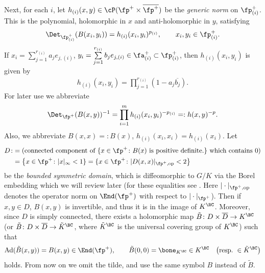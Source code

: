 Next, for each $i$, let $h_{(i)}(x,y)\in\cP(\fp^+\times\overline{\fp^+})$ be the \textit{generic norm} on $\fp^+_{(i)}$.
This is the polynomial, holomorphic in $x$ and anti-holomorphic in $y$, satisfying
\begin{gather*} \Det_{\fp^+_{(i)}}(B(x_i,y_i))=h_{(i)}(x_i,y_i)^{p_{(i)}}, \qquad x_i,y_i\in\fp^+_{(i)} . \end{gather*}
If $x_i=\sum\limits_{j=1}^{r_{(i)}}a_je_{j,(i)}$, $y_i=\sum\limits_{j=1}^{r_{(i)}}b_je_{j,(i)}\in\fa^+_{(i)}\subset\fp^+_{(i)}$,
then $h_{(i)}(x_i,y_i)$ is given by
\begin{gather*} h_{(i)}(x_i,y_i)=\prod_{j=1}^{r_{(i)}}(1-a_j\overline{b_j}). \end{gather*}
For later use we abbreviate
\begin{gather*} \Det_{\fp^+}(B(x,y))^{-1}=\prod_{i=1}^m h_{(i)}(x_i,y_i)^{-p_{(i)}}=:h(x,y)^{-p}. \end{gather*}
Also, we abbreviate $B(x,x)=:B(x)$, $h_{(i)}(x_i,x_i)=h_{(i)}(x_i)$. Let
\begin{align}
D\colon \hspace{-3pt}&=(\text{connected component of }\{x\in \fp^+\colon B(x)\text{ is positive definite.}\}\text{ which contains }0) \notag \\
&=\big\{x\in \fp^+\colon |x|_\infty <1\}=\{x\in \fp^+\colon |D(x,x)|_{\fp^+,\mathrm{op}}<2\big\}\label{BSD}
\end{align}
be the \textit{bounded symmetric domain}, which is diffeomorphic to $G/K$ via the Borel embedding which we will review later
(for these equalities see \cite[Part~V, Proposition~VI.4.2]{FKKLR}. Here $|\cdot|_{\fp^+,\mathrm{op}}$ denotes the
operator norm on $\End(\fp^+)$ with respect to $|\cdot|_{\fp^+}$).
Then if $x,y\in D$, $B(x,y)$ is invertible, and thus it is in the image of $K^\BC$.
Moreover, since $D$ is simply connected, there exists a holomorphic map $\tilde{B}\colon D\times\overline{D}\to K^\BC$
(or $\tilde{B}\colon D\times\overline{D}\to \tilde{K}^\BC$, where $\tilde{K}^\BC$ is the universal covering group of $K^\BC$)
such that
\begin{gather*} \operatorname{Ad}(\tilde{B}(x,y))=B(x,y)\in\End(\fp^+), \qquad \tilde{B}(0,0)=\bone_{K^\BC}\in K^\BC \quad \big(\text{resp.} \ {} \in \tilde{K}^\BC\big) \end{gather*}
holds. From now on we omit the tilde, and use the same symbol $B$ instead of $\tilde{B}$.

